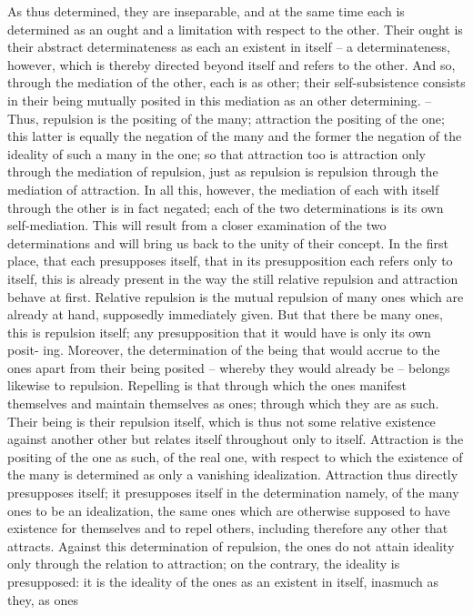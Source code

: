 As thus determined, they are inseparable, and at the same time each
is determined as an ought and a limitation with respect to the other.
Their ought is their abstract determinateness as each an existent in itself –
a determinateness, however, which is thereby directed beyond itself and
refers to the other. And so, through the mediation of the other, each is as
other; their self-subsistence consists in their being mutually posited in this
mediation as an other determining. – Thus, repulsion is the positing of the
many; attraction the positing of the one; this latter is equally the negation
of the many and the former the negation of the ideality of such a many in
the one; so that attraction too is attraction only through the mediation of
repulsion, just as repulsion is repulsion through the mediation of attraction.
In all this, however, the mediation of each with itself through the other is
in fact negated; each of the two determinations is its own self-mediation.
This will result from a closer examination of the two determinations and
will bring us back to the unity of their concept.
In the first place, that each presupposes itself, that in its presupposition
each refers only to itself, this is already present in the way the still relative
repulsion and attraction behave at first.
Relative repulsion is the mutual repulsion of many ones which are already
at hand, supposedly immediately given. But that there be many ones, this is
repulsion itself; any presupposition that it would have is only its own posit-
ing. Moreover, the determination of the being that would accrue to the ones
apart from their being posited – whereby they would already be – belongs
likewise to repulsion. Repelling is that through which the ones manifest
themselves and maintain themselves as ones; through which they are as
such. Their being is their repulsion itself, which is thus not some relative
existence against another other but relates itself throughout only to itself.
Attraction is the positing of the one as such, of the real one, with respect
to which the existence of the many is determined as only a vanishing
idealization. Attraction thus directly presupposes itself; it presupposes itself
in the determination namely, of the many ones to be an idealization, the
same ones which are otherwise supposed to have existence for themselves
and to repel others, including therefore any other that attracts. Against this
determination of repulsion, the ones do not attain ideality only through
the relation to attraction; on the contrary, the ideality is presupposed: it
is the ideality of the ones as an existent in itself, inasmuch as they, as ones
